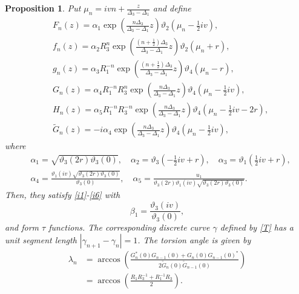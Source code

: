 \documentclass[10pt,a4paper]{amsart}
\newtheorem{prop}{Proposition}
\begin{document}
\begin{prop}\label{thm:PhDKal1}
Put $\mu_{n}=ivn+\frac{z}{\Delta_{3}-\Delta_{1}}$
and define
\begin{align}\label{t1}
&F_{n}(z)=\alpha_1\exp\left(\frac{n\Delta_{3}}{\Delta_{3}-\Delta_{1}}z\right)\vartheta_2\left(\mu_{n}-\frac{1}{2}iv\right),\\
&f_{n}(z)=\alpha_2 R_{3}^{n}\exp\left(\frac{\left(n+\frac{1}{2}\right)\Delta_{3}}{\Delta_{3}-\Delta_{1}}z\right)\vartheta_2\left(\mu_{n}+r\right), \nonumber\\
&g_{n}(z)=\alpha_3 R_{1}^{-n}\exp\left(\frac{\left(n+\frac{1}{2}\right)\Delta_{3}}{\Delta_{3}-\Delta_{1}}z\right)\vartheta_4\left(\mu_{n}-r\right), \nonumber\\
&G_{n}(z)=\alpha_4 R_{1}^{-n}R_{3}^{n}\exp\left(\frac{n\Delta_{3}}{\Delta_{3}-\Delta_{1}}z\right)\vartheta_4\left(\mu_{n}-\frac{1}{2}iv\right), \nonumber\\
&H_{n}(z)=\alpha_5 R_{1}^{-n}R_{3}^{-n}\exp\left(\frac{n\Delta_{3}}{\Delta_{3}-\Delta_{1}}z\right)\vartheta_4\left(\mu_{n}-\frac{1}{2}iv-2r\right), \nonumber \\
&\widetilde{G}_{n}(z)=-i\alpha_4\exp\left(\frac{n\Delta_{3}}{\Delta_{3}-\Delta_{1}}z\right)\vartheta_4\left(\mu_{n}-\frac{1}{2}iv\right), \nonumber
\end{align}
where
\begin{align}
&\alpha_1=\sqrt{\vartheta_3(2r)\vartheta_3(0)},\quad \alpha_2=\vartheta_3\left(-\frac{1}{2}iv+r\right),\quad \alpha_3=\vartheta_1\left(\frac{1}{2}iv+r\right),\nonumber\\
&\alpha_4=\frac{\vartheta_1(iv)\sqrt{\vartheta_3(2r)\vartheta_3(0)}}{\vartheta_3(0)},\quad \alpha_5=\frac{u_{1}}{\vartheta_3(2r)\vartheta_1(iv)\sqrt{\vartheta_3(2r)\vartheta_3(0)}}.\nonumber
\end{align}
Then, they satisfy \eqref{i1}-\eqref{i6} with
\begin{equation}\label{beta_1}
\beta_{1}=\frac{\vartheta_3(iv)}{\vartheta_3(0)},
\end{equation}
and form $\tau$ functions.
The corresponding discrete curve $\gamma$ defined by \eqref{T} has a unit segment length $\left|\gamma_{n+1}-\gamma_{n}\right|=1$.
The torsion angle is given by
\begin{equation}\label{lam1}
\begin{split}
\lambda_n&=\arccos\left(\frac{G_{n}^{*}(0)G_{n-1}(0)+G_{n}(0)G_{n-1}(0)^{*}}{2\widetilde{G}_{n}(0)\widetilde{G}_{n-1}(0)}\right)\\
&=\arccos\left(\frac{R_{1}R_{3}^{-1}+R_{1}^{-1}R_{3}}{2}\right).

\end{split}
\end{equation}
\end{prop}
\end{document}
